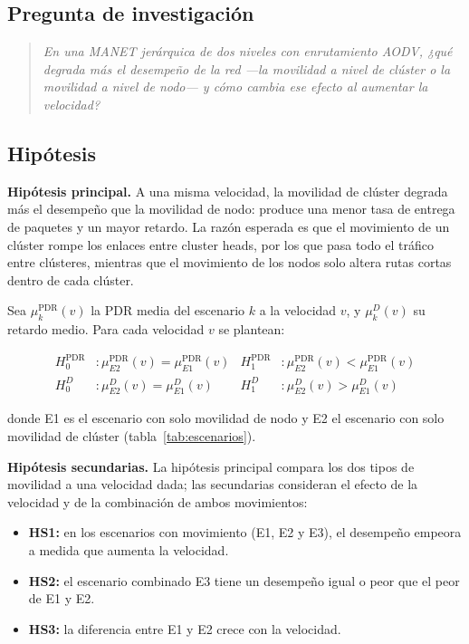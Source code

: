 \subsection{Pregunta de investigación}
\label{sec:preg}

\begin{quote}
\emph{En una MANET jerárquica de dos niveles con enrutamiento AODV, ¿qué degrada más el
desempeño de la red —la movilidad a nivel de clúster o la movilidad a nivel de nodo— y
cómo cambia ese efecto al aumentar la velocidad?}
\end{quote}

\subsection{Hipótesis}
\label{sec:hip}

\textbf{Hipótesis principal.} A una misma velocidad, la movilidad de clúster degrada más
el desempeño que la movilidad de nodo: produce una menor tasa de entrega de paquetes y un
mayor retardo. La razón esperada es que el movimiento de un clúster rompe los enlaces
entre cluster heads, por los que pasa todo el tráfico entre clústeres, mientras que el
movimiento de los nodos solo altera rutas cortas dentro de cada clúster.

Sea $\mu_{k}^{\mathrm{PDR}}(v)$ la PDR media del escenario $k$ a la velocidad $v$, y
$\mu_{k}^{D}(v)$ su retardo medio. Para cada velocidad $v$ se plantean:

\begin{align*}
H_0^{\mathrm{PDR}}&: \mu_{E2}^{\mathrm{PDR}}(v) = \mu_{E1}^{\mathrm{PDR}}(v) &
H_1^{\mathrm{PDR}}&: \mu_{E2}^{\mathrm{PDR}}(v) < \mu_{E1}^{\mathrm{PDR}}(v) \\
H_0^{D}&: \mu_{E2}^{D}(v) = \mu_{E1}^{D}(v) &
H_1^{D}&: \mu_{E2}^{D}(v) > \mu_{E1}^{D}(v)
\end{align*}

donde E1 es el escenario con solo movilidad de nodo y E2 el escenario con solo
movilidad de clúster (tabla~\ref{tab:escenarios}).

\textbf{Hipótesis secundarias.} La hipótesis principal compara los dos tipos de
movilidad a una velocidad dada; las secundarias consideran el efecto de la velocidad y de la combinación de ambos movimientos:
\begin{itemize}
    \item \textbf{HS1:} en los escenarios con movimiento (E1, E2 y E3), el desempeño
    empeora a medida que aumenta la velocidad.
    \item \textbf{HS2:} el escenario combinado E3 tiene un desempeño igual o peor que el
    peor de E1 y E2.
    \item \textbf{HS3:} la diferencia entre E1 y E2 crece con la velocidad.
\end{itemize}

